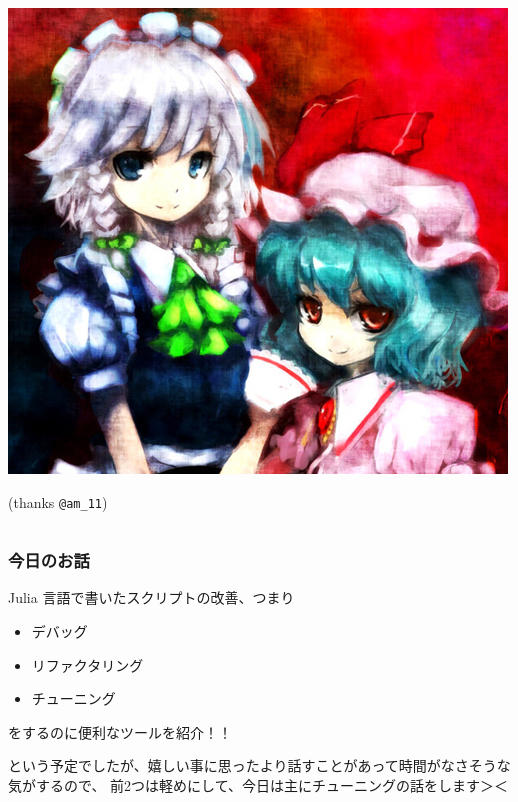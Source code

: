 \documentclass[dvipdfmx]{beamer}
\begin{document}
\begin{frame}[containsverbatim]
\begin{columns}
\begin{column}{.3\linewidth}
  \includegraphics[width=\linewidth]{sakuremi.jpg}

  (thanks \verb|@am_11|)
\end{column}
  \end{columns}
\end{frame}

\begin{frame}
  \frametitle{今日のお話}
  Julia 言語で書いたスクリプトの改善、つまり
  \begin{itemize}
    \item デバッグ
    \item リファクタリング
    \item チューニング
  \end{itemize}
  をするのに便利なツールを紹介！！

  という予定でしたが、嬉しい事に思ったより話すことがあって時間がなさそうな気がするので、
  前2つは軽めにして、今日は主にチューニングの話をします＞＜
  \onslide
\end{frame}





\end{document}
